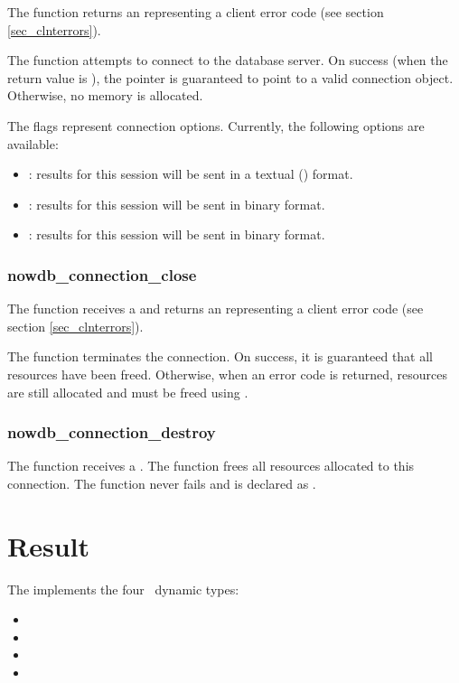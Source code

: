 The function returns an  representing
a client error code (see section \ref{sec_clnterrors}).

The function attempts to connect to the database server.
On success (when the return value is ),
the  pointer is guaranteed
to point to a valid connection object.
Otherwise, no memory is allocated.

The flags represent connection options.
Currently, the following options are available:
\begin{itemize}
\item {}:
results for this session will be sent
in a textual () format.

\item {}:
results for this session will be sent
in binary  format.

\item {}:
results for this session will be sent
in binary  format.
\end{itemize}

\subsubsection{nowdb\_connection\_close}
The function receives a 
and returns an  representing
a client error code (see section \ref{sec_clnterrors}).

The function terminates the connection.
On success, it is guaranteed that all
resources have been freed.
Otherwise, when an error code is returned,
resources are still allocated and must be
freed using .

\subsubsection{nowdb\_connection\_destroy}
The function receives a .
The function frees all resources allocated to this connection.
The function never fails and
is declared as .

\section{Result}
The  implements the four
\nowdb\ dynamic types:

\begin{itemize}
\item {}
\item {}
\item {}
\item {}
\end{itemize}

